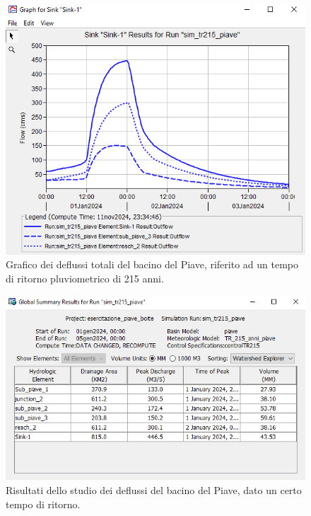 \begin{figure}[H]\centering
    \includegraphics[scale=0.9]{immagini/sink_piave_215.PNG}
    \caption{Grafico dei deflussi totali del bacino del Piave, riferito ad un tempo di ritorno pluviometrico di 215 anni.}
        \label{sink_piave_215}    
\end{figure} 

\begin{figure}[H]\centering
\includegraphics[scale=1]{immagini/risul_piave_215.PNG}
\caption{Risultati dello studio dei deflussi del bacino del Piave, dato un certo tempo di ritorno.}
\label{risul_piave_215}    
\end{figure}

